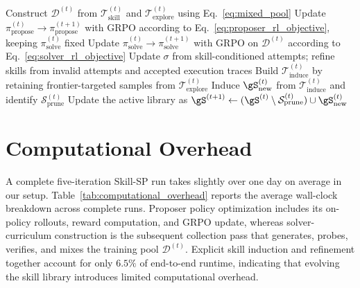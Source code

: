 \begin{algorithm}[htbp]
{        Construct $\mathcal{D}^{(t)}$ from $\mathcal{T}_{\text{skill}}^{(t)}$ and $\mathcal{T}_{\text{explore}}^{(t)}$ using Eq.~\ref{eq:mixed_pool}\;
        Update $\pi_\text{propose}^{(t)} \rightarrow \pi_\text{propose}^{(t+1)}$ with GRPO according to Eq.~\ref{eq:proposer_rl_objective}, keeping $\pi_\text{solve}^{(t)}$ fixed\;
        Update $\pi_\text{solve}^{(t)} \rightarrow \pi_\text{solve}^{(t+1)}$ with GRPO on $\mathcal{D}^{(t)}$ according to Eq.~\ref{eq:solver_rl_objective}\;
        Update $\sigma$ from skill-conditioned attempts; refine skills from invalid attempts and accepted execution traces\;
        Build $\mathcal{T}^{(t)}_{\text{induce}}$ by retaining frontier-targeted samples from $\mathcal{T}_{\text{explore}}^{(t)}$\;
        Induce $\gS_{\text{new}}^{(t)}$ from $\mathcal{T}^{(t)}_{\text{induce}}$ and identify $\mathcal{S}_{\text{prune}}^{(t)}$\;
        Update the active library as $\gS^{(t+1)} \gets (\gS^{(t)} \setminus \mathcal{S}_{\text{prune}}^{(t)}) \cup \gS_{\text{new}}^{(t)}$\;
    }

    \;
\end{algorithm}


\section{Computational Overhead}
\label{app:computational_overhead}

A complete five-iteration Skill-SP run takes slightly over one day on average in our setup. Table~\ref{tab:computational_overhead} reports the average wall-clock breakdown across complete runs. Proposer policy optimization includes its on-policy rollouts, reward computation, and GRPO update, whereas solver-curriculum construction is the subsequent collection pass that generates, probes, verifies, and mixes the training pool $\mathcal{D}^{(t)}$. Explicit skill induction and refinement together account for only $6.5\%$ of end-to-end runtime, indicating that evolving the skill library introduces limited computational overhead.

